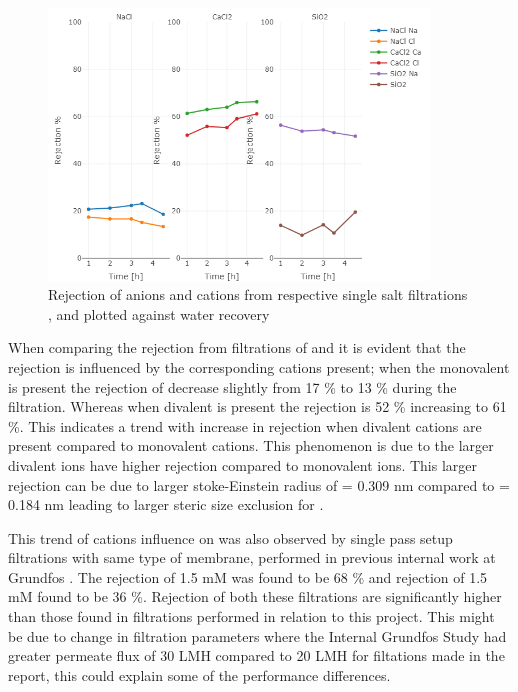 \begin{figure}[h]
    \centering
    \includegraphics[width=0.9\textwidth]{Billeder/data/single_salt/Singlesalt_rejection_batch.png}
    \caption{Rejection of anions and cations from respective single salt filtrations ,  and  plotted against water recovery}
    \label{fig:single_salt_rejection_summary}
\end{figure}


When comparing the  rejection from filtrations of  and  it is evident that the  rejection is influenced by the corresponding cations present; when the monovalent  is present the rejection of  decrease slightly from 17 \% to 13 \% during the filtration. 
Whereas when divalent  is present the  rejection is 52 \% increasing to 61 \%. 
This indicates a trend with increase in  rejection when divalent cations are present compared to monovalent cations.
This phenomenon is due to the larger divalent  ions have higher rejection %
compared to monovalent  ions. %
This larger rejection can be due to larger stoke-Einstein radius of  = 0.309 nm compared to = 0.184 nm leading to larger steric size exclusion for . 

This trend of cations influence on  was also observed by single pass setup filtrations with same type of membrane, performed in previous internal work at Grundfos \citep{Sebastians_master_2020}. 
The rejection of 1.5 mM  was found to be 68 \% and rejection of 1.5 mM  found to be 36 \%. \citep{Sebastians_master_2020}
Rejection of both these filtrations are significantly higher than those found in filtrations performed in relation to this project. 
This might be due to change in filtration parameters where the Internal Grundfos Study \citep{Sebastians_master_2020} had greater permeate flux of 30 LMH compared to 20 LMH for filtations made in the report, this could explain some of the performance differences.


